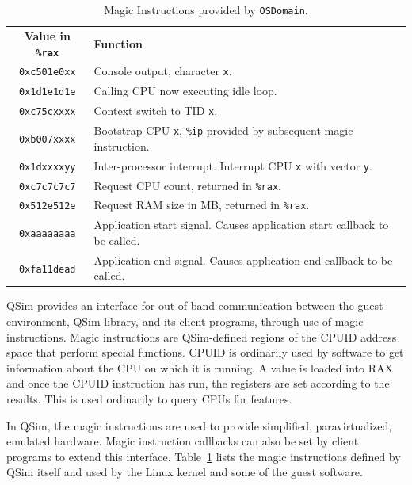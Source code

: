 \documentclass[letterpaper, 10pt]{book}
\begin{document}
\begin{table}
\begin{tabular}{c|l}
  \textbf{Value in \texttt{\%rax}}&\textbf{Function}\\
  \texttt{0xc501e0xx}&Console output, character \texttt{x}.\\
  \texttt{0x1d1e1d1e}&Calling CPU now executing idle loop.\\
  \texttt{0xc75cxxxx}&Context switch to TID \texttt{x}.\\
  \texttt{0xb007xxxx}&Bootstrap CPU \texttt{x}, \texttt{\%ip} provided by
                      subsequent magic instruction.\\
  \texttt{0x1dxxxxyy}&Inter-processor interrupt. Interrupt CPU \texttt{x} with
                      vector \texttt{y}.\\
  \texttt{0xc7c7c7c7}&Request CPU count, returned in \texttt{\%rax}.\\
  \texttt{0x512e512e}&Request RAM size in MB, returned in \texttt{\%rax}.\\
  \texttt{0xaaaaaaaa}&Application start signal. Causes application start 
                      callback to be called.\\
  \texttt{0xfa11dead}&Application end signal. Causes application end callback
                      to be called.\\
\end{tabular}
\caption{Magic Instructions provided by \texttt{OSDomain}.}
\label{table:magic}
\end{table}

QSim provides an interface for out-of-band communication between the guest
environment, QSim library, and its client programs, through use of magic
instructions. Magic instructions are QSim-defined regions of the CPUID address
space that perform special functions. CPUID is ordinarily used by software to
get information about the CPU on which it is running. A value is loaded into RAX
and once the CPUID instruction has run, the registers are set according to the
results. This is used ordinarily to query CPUs for features.

In QSim, the magic instructions are used to provide simplified, paravirtualized,
emulated hardware. Magic instruction callbacks can also be set by client
programs to extend this interface. Table~\ref{table:magic} lists the magic
instructions defined by QSim itself and used by the Linux kernel and some of the
guest software.
\end{document}
